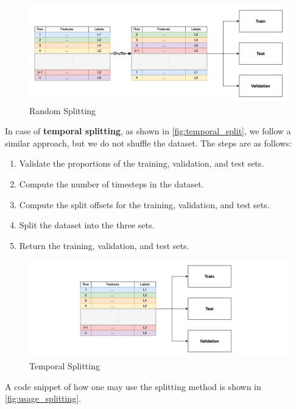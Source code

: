 \documentclass[review]{AIM_report}
\begin{document}
\begin{figure}
    \centering
    \includegraphics[width=1\textwidth]{files/splitting/random_split.png}
    \caption{Random Splitting}
    \label{fig:random_split}
\end{figure}

In case of \textbf{temporal splitting}, as shown in \autoref{fig:temporal_split}, we follow a similar approach, but we do not shuffle the dataset. The steps are as follows:
\begin{enumerate}
    \item Validate the proportions of the training, validation, and test sets.
    \item Compute the number of timesteps in the dataset.
    \item Compute the split offsets for the training, validation, and test sets.
    \item Split the dataset into the three sets.
    \item Return the training, validation, and test sets.
\end{enumerate}

\newpage

\begin{figure}
    \centering
    \includegraphics[width=1\textwidth]{files/splitting/temporal_split.png}
    \caption{Temporal Splitting}
    \label{fig:temporal_split}
\end{figure}

A code snippet of how one may use the splitting method is shown in \autoref{fig:usage_splitting}.
\end{document}
